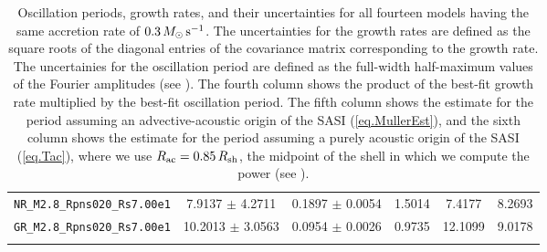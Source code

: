 \begin{table}[b]
\begin{tabularx}{0.75\textwidth}{cccccc}
    \texttt{NR\_M2.8\_Rpns020\_Rs7.00e1} & 7.9137 $\pm$ 4.2711 & 0.1897 $\pm$ 0.0054 & 1.5014 & 7.4177 & 8.2693 \\
    \texttt{GR\_M2.8\_Rpns020\_Rs7.00e1} & 10.2013 $\pm$ 3.0563 & 0.0954 $\pm$ 0.0026 & 0.9735 & 12.1099 & 9.0178 \\
    \bottomrule \\
  \end{tabularx}
  \caption{
Oscillation periods, growth rates, and their uncertainties for all
fourteen models having the same accretion rate of $0.3\,M_{\odot}\,\mathrm{s}^{-1}$.
The uncertainties for the growth rates are defined as the square roots of the
diagonal entries of the covariance matrix corresponding to the growth rate.
The uncertainies for the oscillation period are defined as the full-width
half-maximum values of the Fourier amplitudes (see ).
The fourth column shows the product of the best-fit growth rate multiplied
by the best-fit oscillation period.
The fifth column shows the estimate for the period assuming an
advective-acoustic origin of the SASI (\eqref{eq.MullerEst}),
and the sixth column shows the estimate for the period assuming
a purely acoustic origin of the SASI (\eqref{eq.Tac}), where we use
$R_{\mathrm{ac}}=0.85\,R_{\mathrm{sh}}$, the midpoint
of the shell in which we compute the power (see ).}
  \label{tab.results}
\end{table}
